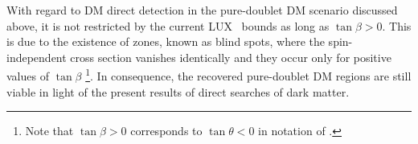 With regard to DM direct detection in the pure-doublet DM scenario
discussed above, it is not restricted by the current LUX~\cite{Akerib:2013tjd} bounds as
long as $\tan\beta>0$.  
This is due to the existence of zones, known as blind spots, where the
spin-independent cross section vanishes identically and they occur
only for positive values of $\tan\beta$
\cite{Cheung:2013dua}\footnote{Note that $\tan\beta>0$ corresponds to
  $\tan\theta<0$ in notation of  \cite{Cheung:2013dua}.}. 
In consequence, the recovered pure-doublet DM regions are still viable
in light of the present results of direct searches of dark matter.  






